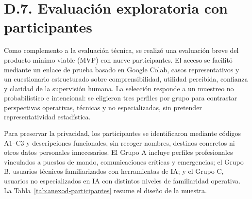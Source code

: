 \section*{D.7. Evaluación exploratoria con participantes}

Como complemento a la evaluación técnica, se realizó una evaluación breve del producto
mínimo viable (MVP) con nueve participantes. El acceso se facilitó mediante un enlace de
prueba basado en Google Colab, casos representativos y un
cuestionario estructurado sobre comprensibilidad, utilidad percibida, confianza y
claridad de la supervisión humana. La selección responde a un muestreo no probabilístico
e intencional: se eligieron tres perfiles por grupo para contrastar perspectivas operativas,
técnicas y no especializadas, sin pretender representatividad estadística.

Para preservar la privacidad, los participantes se identificaron mediante códigos
A1--C3 y descripciones funcionales, sin recoger nombres, destinos concretos ni otros
datos personales innecesarios. El Grupo A incluye perfiles profesionales vinculados a
puestos de mando, comunicaciones críticas y emergencias; el Grupo B, usuarios técnicos
familiarizados con herramientas de IA; y el Grupo C, usuarios no especializados en IA
con distintos niveles de familiaridad operativa. La Tabla~\ref{tab:anexod-participantes}
resume el diseño de la muestra.

